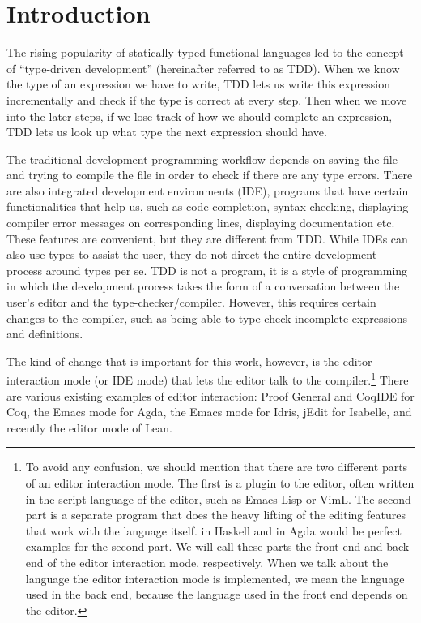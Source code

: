 \section{Introduction} \label{sec:introduction}

The rising popularity of statically typed functional languages led to
the concept of ``type-driven development'' (hereinafter referred to as TDD).
When we know the type of an expression we have to write, TDD lets us write this
expression incrementally and check if the type is correct at every step.  Then
when we move into the later steps, if we lose track of how we should complete
an expression, TDD lets us look up what type the next expression should have.

The traditional development programming workflow depends on saving the
file and trying to compile the file in order to check if there are any type
errors. There are also integrated development environments (IDE), programs that have
certain functionalities that help us, such as code completion, syntax checking,
displaying compiler error messages on corresponding lines, displaying
documentation etc.  These features are convenient, but they are different from
TDD. While IDEs can also use types to assist the user, they do not direct the
entire development process around types per se. TDD is not a program, it is a
style of programming in which the development process takes the form of a
conversation between the user's editor and the type-checker/compiler. However,
this requires certain changes to the compiler, such as being able to type check
incomplete expressions and definitions.\cite{tdd}


The kind of change that is important for this work, however, is the editor
interaction mode (or IDE mode) that lets the editor
talk to the compiler.\footnote{To avoid any confusion, we should mention that
  there are two different parts of an editor interaction mode. The first is a
  plugin to the editor, often written in the script language of the editor,
  such as Emacs Lisp or VimL. The second part is a separate program that does
  the heavy lifting of the editing features that work with the language
  itself.   in Haskell and  in Agda would be
  perfect examples for the second part. We will call these parts the front
  end and back end of the editor interaction mode, respectively.
  When we talk about the language the editor interaction mode is implemented,
  we mean the language used in the back end, because the language used in the
  front end depends on the editor.}
There are various existing examples of editor interaction:
Proof General\cite{pg} and CoqIDE for Coq\cite{coq},
the Emacs mode\cite{agdamode} for Agda\cite{agda},
the Emacs mode\cite{idrismode} for Idris\cite{idris},
jEdit\cite{isabellejedit} for Isabelle\cite{isabelle},
and recently the editor mode of Lean\cite{lean}.


